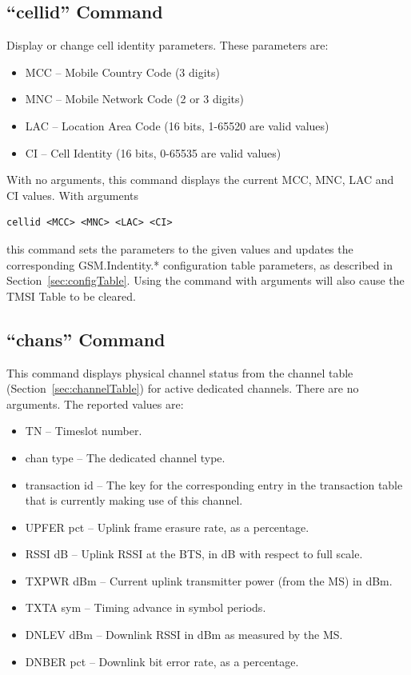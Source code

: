 \documentclass[11pt,openany]{book}
\begin{document}
\subsection{``cellid'' Command}
\label{sec:cellidCmd}
Display or change cell identity parameters.  These parameters are:
\begin{itemize}
\item MCC -- Mobile Country Code (3 digits)
\item MNC -- Mobile Network Code (2 or 3 digits)
\item LAC -- Location Area Code (16 bits, 1-65520 are valid values)
\item CI -- Cell Identity (16 bits, 0-65535 are valid values)
\end{itemize}
With no arguments, this command displays the current MCC, MNC, LAC and CI values.
With arguments
\begin{verbatim}
cellid <MCC> <MNC> <LAC> <CI>
\end{verbatim}
this command sets the parameters to the given values and updates the corresponding GSM.Indentity.* configuration table parameters, as described in Section~\ref{sec:configTable}.
Using the command with arguments will also cause the TMSI Table to be cleared.

\subsection{``chans'' Command}
\label{sec:chansCmd}
This command displays physical channel status from the channel table (Section~\ref{sec:channelTable}) for active dedicated channels.
There are no  arguments.
The reported values are:
\begin{itemize}
\item TN -- Timeslot number.
\item chan type -- The dedicated channel type.
\item transaction id -- The key for the corresponding entry in the transaction table that is currently making use of this channel.
\item UPFER pct -- Uplink frame erasure rate, as a percentage.
\item RSSI dB -- Uplink RSSI at the BTS, in dB with respect to full scale.
\item TXPWR dBm -- Current uplink transmitter power (from the MS) in dBm.
\item TXTA sym -- Timing advance in symbol periods.
\item DNLEV dBm -- Downlink RSSI in dBm as measured by the MS.
\item DNBER pct -- Downlink bit error rate, as a percentage.
\end{itemize}
\end{document}
